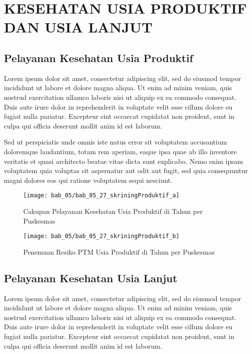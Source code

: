 \section[USIPRO \& USILA]{KESEHATAN USIA PRODUKTIF DAN USIA LANJUT}
\subsection{Pelayanan Kesehatan Usia Produktif}
Lorem ipsum dolor sit amet, consectetur adipiscing elit, sed do eiusmod tempor incididunt ut labore et dolore magna aliqua. Ut enim ad minim veniam, quis nostrud exercitation ullamco laboris nisi ut aliquip ex ea commodo consequat. Duis aute irure dolor in reprehenderit in voluptate velit esse cillum dolore eu fugiat nulla pariatur. Excepteur sint occaecat cupidatat non proident, sunt in culpa qui officia deserunt mollit anim id est laborum.

Sed ut perspiciatis unde omnis iste natus error sit voluptatem accusantium doloremque laudantium, totam rem aperiam, eaque ipsa quae ab illo inventore veritatis et quasi architecto beatae vitae dicta sunt explicabo. Nemo enim ipsam voluptatem quia voluptas sit aspernatur aut odit aut fugit, sed quia consequuntur magni dolores eos qui ratione voluptatem sequi nesciunt.

\begin{figure}[H]
    \centering
    \texttt{[image: bab\_05/bab\_05\_27\_skriningProduktif\_a]}
    \caption{Cakupan Pelayanan Kesehatan Usia Produktif di \namaKabupaten Tahun \tP per Puskesmas}
    \label{fig:Cakupan-Yankes-Usprod}
\end{figure}

\begin{figure}[H]
    \centering
    \texttt{[image: bab\_05/bab\_05\_27\_skriningProduktif\_b]}
    \caption{Penemuan Resiko PTM Usia Produktif di \namaKabupaten Tahun \tP per Puskesmas}
    \label{fig:Cakupan-Resiko-PTM-Usprod}
\end{figure}

\subsection{Pelayanan Kesehatan Usia Lanjut}

Lorem ipsum dolor sit amet, consectetur adipiscing elit, sed do eiusmod tempor incididunt ut labore et dolore magna aliqua. Ut enim ad minim veniam, quis nostrud exercitation ullamco laboris nisi ut aliquip ex ea commodo consequat. Duis aute irure dolor in reprehenderit in voluptate velit esse cillum dolore eu fugiat nulla pariatur. Excepteur sint occaecat cupidatat non proident, sunt in culpa qui officia deserunt mollit anim id est laborum.

